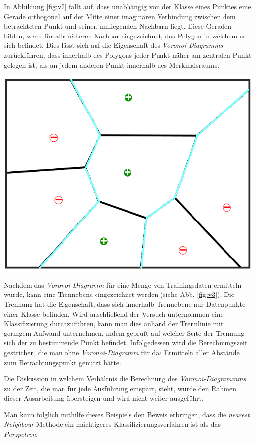 \documentclass[fontsize=11pt]{scrartcl}
\newenvironment{Figure}
  {\par\medskip\noindent\minipage{\linewidth}}
  {\endminipage\par\medskip}
\begin{document}
            In Abbildung \ref{fig:v2} fällt auf, dass unabhängig von der Klasse eines Punktes eine Gerade orthogonal auf der Mitte einer imaginären Verbindung zwischen dem betrachteten Punkt und seinen umliegenden Nachbarn liegt. Diese Geraden bilden, wenn für alle näheren Nachbar eingezeichnet, das Polygon in welchem er sich befindet. Dies lässt sich auf die Eigenschaft des \emph{Voronoi-Diagramms} zurückführen, dass innerhalb des Polygons jeder Punkt näher am zentralen Punkt gelegen ist, als an jedem anderen Punkt innerhalb des Merkmalsraums.
            
            \begin{Figure}
                \centering
                \includegraphics[width=.4\linewidth]{vor3.png}
            \end{Figure}

            Nachdem das \emph{Voronoi-Diagramm} für eine Menge von Trainingsdaten ermitteln wurde, kann eine Trennebene eingezeichnet werden (siehe Abb. \ref{fig:v3}). Die Trennung hat die Eigenschaft, dass sich innerhalb Trennebene nur Datenpunkte einer Klasse befinden. Wird anschließend der Versuch unternommen eine Klassifizierung durchzuführen, kann man dies anhand der Trennlinie mit geringem Aufwand unternehmen, indem geprüft auf welcher Seite der Trennung sich der zu bestimmende Punkt befindet. Infolgedessen wird die Berechnungszeit gestrichen, die man ohne \emph{Voronoi-Diagramm} für das Ermitteln aller Abstände zum Betrachtungspunkt genutzt hätte.\par
            Die Diskussion in welchem Verhältnis die Berechnung des \emph{Voronoi-Diagrammms} zu der Zeit, die man für jede Ausführung einspart, steht, würde den Rahmen dieser Ausarbeitung übersteigen und wird nicht weiter ausgeführt.\par
            Man kann folglich mithilfe dieses Beispiels den Beweis erbringen, dass die \emph{nearest Neighbour} Methode ein mächtigeres Klassifizierungsverfahren ist als das \emph{Perzpetron}.
            
\end{document}
